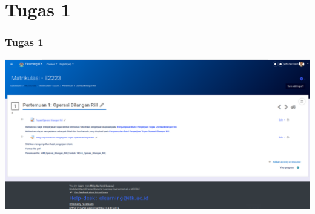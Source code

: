 \documentclass[pdflatex,compress,mathserif]{beamer}
\begin{document}
\section{Tugas 1}

\begin{frame}
	\frametitle{Tugas 1}
	\begin{center}
		\includegraphics[width=\linewidth]{img/img47}
	\end{center}
\end{frame}
\end{document}
